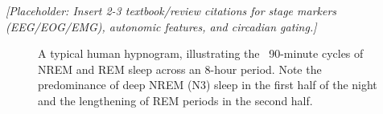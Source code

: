 \textit{[Placeholder: Insert 2-3 textbook/review citations for stage markers (EEG/EOG/EMG), autonomic features, and circadian gating.]}

\begin{figure}[htbp]
  \centering
  \caption{A typical human hypnogram, illustrating the ~90-minute cycles of NREM and REM sleep across an 8-hour period. Note the predominance of deep NREM (N3) sleep in the first half of the night and the lengthening of REM periods in the second half.}
  \label{fig:hypnogram}
\end{figure}
